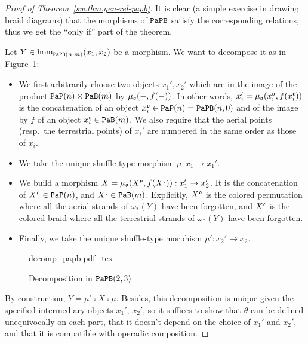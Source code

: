 \begin{proof}[Proof of Theorem~\ref{sw.thm.gen-rel-papb}]
  It is clear (a simple exercise in drawing braid diagrams) that the morphisms of $\mathtt{PaPB}$ satisfy the corresponding relations, thus we get the ``only if'' part of the theorem.

  Let $Y \in \hom_{\mathtt{PaPB}(n,m)}(x_{1}, x_{2})$ be a morphism.
  We want to decompose it as in Figure~\ref{sw.fig.decomp-papb}:
  \begin{itemize}
  \item We first arbitrarily choose two objects $x_{1}', x_{2}'$ which are in the image of the product $\mathtt{PaP}(n) \times \mathtt{PaB}(m)$ by $\mu_{\mathfrak{o}}(-, f(-))$.
    In other words, $x_{i}' = \mu_{\mathfrak{o}}(x_{i}^{\mathfrak{o}}, f(x_{i}^{\mathfrak{c}}))$ is the concatenation of an object $x_{i}^{\mathfrak{o}} \in \mathtt{PaP}(n) = \mathtt{PaPB}(n,0)$ and of the image by $f$ of an object $x_{i}^{\mathfrak{c}} \in \mathtt{PaB}(m)$.
    We also require that the aerial points (resp.\ the terrestrial points) of $x_{i}'$ are numbered in the same order as those of $x_{i}$.
  \item We take the unique shuffle-type morphism $\mu : x_{1} \to x_{1}'$.
  \item We build a morphism $X = \mu_{\mathfrak{o}}(X^{\mathfrak{o}}, f(X^{\mathfrak{c}})) : x_{1}' \to x_{2}'$.
    It is the concatenation of $X^{\mathfrak{o}} \in \mathtt{PaP}(n)$, and $X^{\mathfrak{c}} \in \mathtt{PaB}(m)$.
    Explicitly, $X^{\mathfrak{o}}$ is the colored permutation where all the aerial strands of $\omega_{*}(Y)$ have been forgotten, and $X^{\mathfrak{c}}$ is the colored braid where all the terrestrial strands of $\omega_{*}(Y)$ have been forgotten.
  \item Finally, we take the unique shuffle-type morphism $\mu' : x_{2}' \to x_{2}$.
  \end{itemize}

  \begin{figure}[htbp]
    \centering
    \def\svgwidth{1\textwidth}
    {decomp_papb.pdf_tex}
    \caption{Decomposition in $\mathtt{PaPB}(2,3)$}
    \label{sw.fig.decomp-papb}
  \end{figure}

  By construction, $Y = \mu' \circ X \circ \mu$.
  Besides, this decomposition is unique given the specified intermediary objects $x_{1}'$, $x_{2}'$, so it suffices to show that $\theta$ can be defined unequivocally on each part, that it doesn't depend on the choice of $x_{1}'$ and $x_{2}'$, and that it is compatible with operadic composition.


\end{proof}
